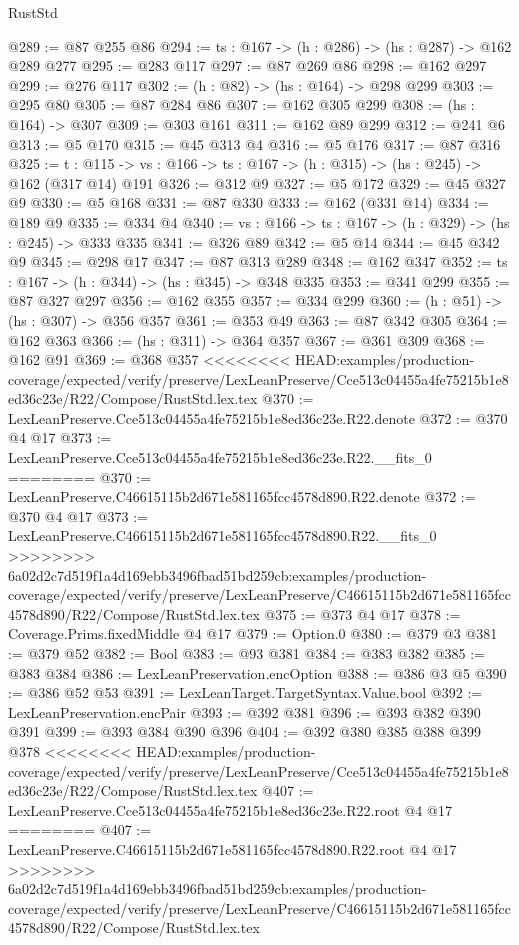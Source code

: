 \begin{lexlean}{RustStd}
\begin{coremodule}
{\begin{coremodule}
@289 := @87 @255 @86
@294 := {ts : @167} -> (h : @286) -> (hs : @287) -> @162 @289 @277
@295 := @283 @117
@297 := @87 @269 @86
@298 := @162 @297
@299 := @276 @117
@302 := (h : @82) -> (hs : @164) -> @298 @299
@303 := @295 @80
@305 := @87 @284 @86
@307 := @162 @305 @299
@308 := (hs : @164) -> @307
@309 := @303 @161
@311 := @162 @89 @299
@312 := @241 @6
@313 := @5 @170
@315 := @45 @313 @4
@316 := @5 @176
@317 := @87 @316
@325 := {t : @115} ->
  {vs : @166} -> {ts : @167} -> (h : @315) -> (hs : @245) -> @162 (@317 @14) @191
@326 := @312 @9
@327 := @5 @172
@329 := @45 @327 @9
@330 := @5 @168
@331 := @87 @330
@333 := @162 (@331 @14)
@334 := @189 @9
@335 := @334 @4
@340 := {vs : @166} -> {ts : @167} -> (h : @329) -> (hs : @245) -> @333 @335
@341 := @326 @89
@342 := @5 @14
@344 := @45 @342 @9
@345 := @298 @17
@347 := @87 @313 @289
@348 := @162 @347
@352 := {ts : @167} -> (h : @344) -> (hs : @345) -> @348 @335
@353 := @341 @299
@355 := @87 @327 @297
@356 := @162 @355
@357 := @334 @299
@360 := (h : @51) -> (hs : @307) -> @356 @357
@361 := @353 @49
@363 := @87 @342 @305
@364 := @162 @363
@366 := (hs : @311) -> @364 @357
@367 := @361 @309
@368 := @162 @91
@369 := @368 @357
<<<<<<<< HEAD:examples/production-coverage/expected/verify/preserve/LexLeanPreserve/Cce513c04455a4fe75215b1e8ed36c23e/R22/Compose/RustStd.lex.tex
@370 := LexLeanPreserve.Cce513c04455a4fe75215b1e8ed36c23e.R22.denote
@372 := @370 @4 @17
@373 := LexLeanPreserve.Cce513c04455a4fe75215b1e8ed36c23e.R22.__fits_0
========
@370 := LexLeanPreserve.C46615115b2d671e581165fcc4578d890.R22.denote
@372 := @370 @4 @17
@373 := LexLeanPreserve.C46615115b2d671e581165fcc4578d890.R22.__fits_0
>>>>>>>> 6a02d2c7d519f1a4d169ebb3496fbad51bd259cb:examples/production-coverage/expected/verify/preserve/LexLeanPreserve/C46615115b2d671e581165fcc4578d890/R22/Compose/RustStd.lex.tex
@375 := @373 @4 @17
@378 := Coverage.Prims.fixedMiddle @4 @17
@379 := Option.{0}
@380 := @379 @3
@381 := @379 @52
@382 := Bool
@383 := @93 @381
@384 := @383 @382
@385 := @383 @384
@386 := LexLeanPreservation.encOption
@388 := @386 @3 @5
@390 := @386 @52 @53
@391 := LexLeanTarget.TargetSyntax.Value.bool
@392 := LexLeanPreservation.encPair
@393 := @392 @381
@396 := @393 @382 @390 @391
@399 := @393 @384 @390 @396
@404 := @392 @380 @385 @388 @399 @378
<<<<<<<< HEAD:examples/production-coverage/expected/verify/preserve/LexLeanPreserve/Cce513c04455a4fe75215b1e8ed36c23e/R22/Compose/RustStd.lex.tex
@407 := LexLeanPreserve.Cce513c04455a4fe75215b1e8ed36c23e.R22.root @4 @17
========
@407 := LexLeanPreserve.C46615115b2d671e581165fcc4578d890.R22.root @4 @17
>>>>>>>> 6a02d2c7d519f1a4d169ebb3496fbad51bd259cb:examples/production-coverage/expected/verify/preserve/LexLeanPreserve/C46615115b2d671e581165fcc4578d890/R22/Compose/RustStd.lex.tex

\end{coremodule}}
\end{coremodule}
\end{lexlean}
